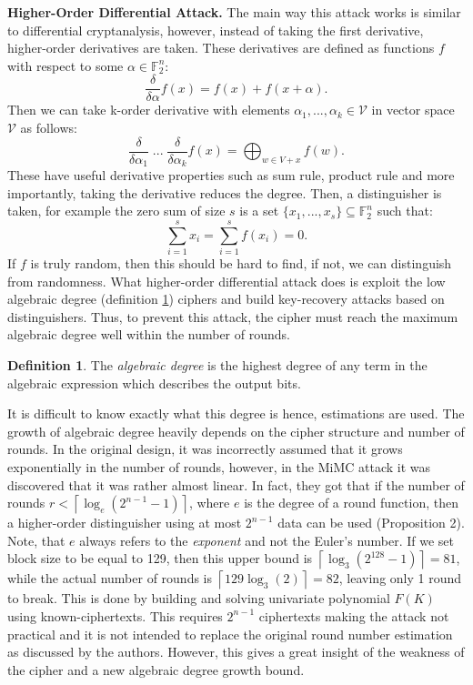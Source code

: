 \documentclass{Resources/UoBLab1}
\theoremstyle{definition}
\newtheorem{definition}[theorem]{Definition}
\begin{document}
\noindent\textbf{Higher-Order Differential Attack.} The main way this attack works is similar to differential cryptanalysis, however, instead of taking the first derivative, higher-order derivatives are taken. These derivatives are defined as functions $f$ with respect to some $\alpha \in \mathbb{F}^n_2$:
\[
    \frac{\delta}{\delta \alpha}f(x) = f(x) + f(x + \alpha).
\]
Then we can take k-order derivative with elements $\alpha_1, ..., \alpha_k \in \mathcal{V}$ in vector space $\mathcal{V}$ as follows:
\[
    \frac{\delta}{\delta \alpha_1}\;...\;\frac{\delta}{\delta \alpha_k} f(x) = \bigoplus_{w \in V + x}f(w).
\]
These have useful derivative properties such as sum rule, product rule and more importantly, taking the derivative reduces the degree. Then, a distinguisher is taken, for example the zero sum of size $s$ is a set $\{x_1, ..., x_s\} \subseteq \mathbb{F}^n_2$ such that:
\[
    \sum^s_{i=1}x_i = \sum^s_{i=1}f(x_i) = 0.
\]
If $f$ is truly random, then this should be hard to find, if not, we can distinguish from randomness. What higher-order differential attack does is exploit the low algebraic degree (definition \ref{def:3.1}) ciphers and build key-recovery attacks based on distinguishers\cite{CryptanalysisCource}. Thus, to prevent this attack, the cipher must reach the maximum algebraic degree well within the number of rounds.
\begin{definition}\label{def:3.1}
    The \textit{algebraic degree} is the highest degree of any term in the algebraic expression which describes the output bits.
\end{definition}
It is difficult to know exactly what this degree is hence, estimations are used. The growth of algebraic degree heavily depends on the cipher structure and number of rounds. In the original design, it was incorrectly assumed that it grows exponentially in the number of rounds, however, in the MiMC attack\cite{MiMCAttack} it was discovered that it was rather almost linear. In fact, they got that if the number of rounds \(r < \left\lceil \log_e(2^{n-1}-1) \right\rceil\), where $e$ is the degree of a round function, then a higher-order distinguisher using at most $2^{n-1}$ data can be used (Proposition 2\cite{MiMCAttack}). Note, that $e$ always refers to the \textit{exponent} and not the Euler's number. If we set block size to be equal to 129, then this upper bound is \(\left\lceil \log_3(2^{128}-1) \right\rceil = 81\), while the actual number of rounds is \(\left\lceil 129\log_3(2) \right\rceil = 82\), leaving only 1 round to break. This is done by building and solving univariate polynomial $F(K)$ using known-ciphertexts. This requires $2^{n-1}$ ciphertexts making the attack not practical and it is not intended to replace the original round number estimation as discussed by the authors. However, this gives a great insight of the weakness of the cipher and a new algebraic degree growth bound.
\end{document}
